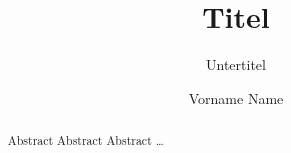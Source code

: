 \documentclass[margin=small]{hsrbericht}
\title{Titel}
\subtitle{Untertitel}
\author{Vorname Name}
\begin{document}
\maketitle
\begin{abstract}
Abstract Abstract Abstract \dots
\end{abstract}

\pagestyle{hsrbericht}

\Blinddocument
\end{document}

